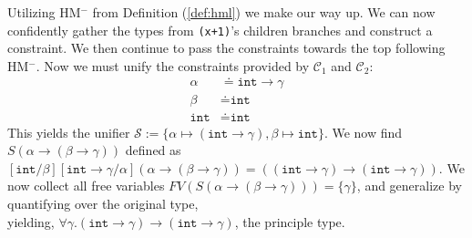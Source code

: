 \begin{Example}
    \vspace{1em}
    \noindent
    Utilizing HM$^-$ from Definition (\ref{def:hml}) we make our way up. We can now confidently gather 
    the types from \texttt{(x+1)}'s children branches and construct a constraint. We then continue to pass the constraints towards the top following HM$^-$. Now we must unify the constraints provided by 
    $\mathcal{C}_1$ and $\mathcal{C}_2$:
    \begin{align*}
        \alpha &\doteq \texttt{int} \to \gamma \\
        \beta &\doteq \texttt{int}\\
        \texttt{int} &\doteq \texttt{int}
    \end{align*}
    This yields the unifier $\mathcal{S}:=\{\alpha\mapsto(\texttt{int}\to\gamma),\beta\mapsto\texttt{int}\}$. We now find $S(\alpha\to(\beta\to\gamma))$ defined as $[\texttt{int}/\beta][\texttt{int}\to\gamma/\alpha](\alpha\to(\beta\to\gamma))=((\texttt{int}\to\gamma)\to(\texttt{int}\to\gamma))$.
    We now collect all free variables $FV(S(\alpha\to(\beta\to\gamma)))=\{\gamma\}$, and generalize by quantifying over the original type,\\
    yielding, 
    $\forall\gamma.(\texttt{int}\to\gamma)\to(\texttt{int}\to\gamma)$,
    \noindent
    the principle type.

\end{Example}

\newpage 

